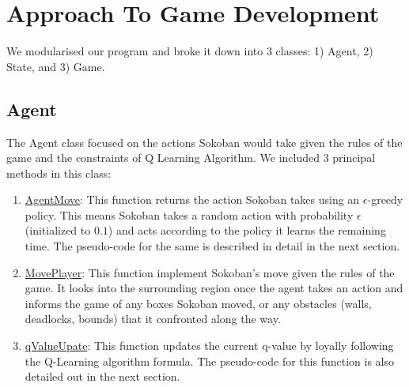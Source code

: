 \documentclass{article}
\begin{document}

\section{Approach To Game Development}

We modularised our program and broke it down into 3 classes: 1) Agent, 2) State, and 3) Game.

\subsection{Agent}
The Agent class focused on the actions Sokoban would take given the rules of the game and the constraints of Q Learning Algorithm. We included 3 principal methods in this class:
    
\begin{enumerate}[label=\alph*)]
    \item \underline{AgentMove}: This function returns the action Sokoban takes using an $\epsilon$-greedy policy. This means Sokoban takes a random action with probability $\epsilon$ (initialized to $0.1$) and acts according to the policy it learns the remaining time. The pseudo-code for the same is described in detail in the next section.
    \item \underline{MovePlayer}: This function implement Sokoban's move given the rules of the game. It looks into the surrounding region once the agent takes an action and informs the game of any boxes Sokoban moved, or any obstacles (walls, deadlocks, bounds) that it confronted along the way. 
    \item \underline{qValueUpate}: This function updates the current q-value by loyally following the Q-Learning algorithm formula. The pseudo-code for this function is also detailed out in the next section. 
\end{enumerate}
\end{document}
